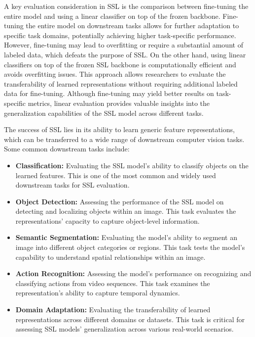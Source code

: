 A key evaluation consideration in SSL is the comparison between fine-tuning the entire model and using a linear classifier on top of the frozen backbone. Fine-tuning the entire model on downstream tasks allows for further adaptation to specific task domains, potentially achieving higher task-specific performance. However, fine-tuning may lead to overfitting or require a substantial amount of labeled data, which defeats the purpose of SSL. On the other hand, using linear classifiers on top of the frozen SSL backbone is computationally efficient and avoids overfitting issues. This approach allows researchers to evaluate the transferability of learned representations without requiring additional labeled data for fine-tuning. Although fine-tuning may yield better results on task-specific metrics, linear evaluation provides valuable insights into the generalization capabilities of the SSL model across different tasks.

The success of SSL lies in its ability to learn generic feature representations, which can be transferred to a wide range of downstream computer vision tasks. Some common downstream tasks include:

\begin{itemize}
	\item \textbf{Classification:} Evaluating the SSL model's ability to classify objects on the learned features. This is one of the most common and widely used downstream tasks for SSL evaluation.

	\item \textbf{Object Detection:} Assessing the performance of the SSL model on detecting and localizing objects within an image. This task evaluates the representations' capacity to capture object-level information.

 	\item \textbf{Semantic Segmentation:} Evaluating the model's ability to segment an image into different object categories or regions. This task tests the model's capability to understand spatial relationships within an image.

  	\item \textbf{Action Recognition:} Assessing the model's performance on recognizing and classifying actions from video sequences. This task examines the representation's ability to capture temporal dynamics.

   	\item \textbf{Domain Adaptation:} Evaluating the transferability of learned representations across different domains or datasets. This task is critical for assessing SSL models' generalization across various real-world scenarios.
     
\end{itemize}

